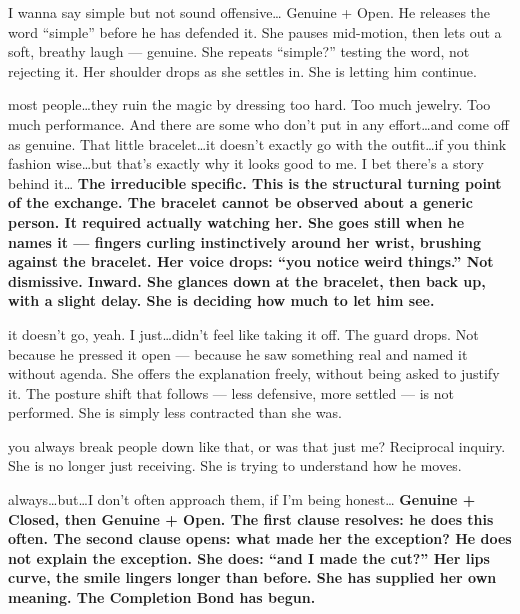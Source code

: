 {I wanna say simple but not sound offensive\ldots}
{Genuine + Open. He releases the word ``simple'' before he has defended it. She pauses mid-motion, then lets out a soft, breathy laugh --- genuine. She repeats ``simple?'' testing the word, not rejecting it. Her shoulder drops as she settles in. She is letting him continue.}

\thinrule

{most people\ldots they ruin the magic by dressing too hard. Too much jewelry. Too much performance. And there are some who don't put in any effort\ldots and come off as genuine. That little bracelet\ldots it doesn't exactly go with the outfit\ldots if you think fashion wise\ldots but that's exactly why it looks good to me. I bet there's a story behind it\ldots}
{\textbf{The irreducible specific. This is the structural turning point of the exchange. The bracelet cannot be observed about a generic person. It required actually watching her. She goes still when he names it --- fingers curling instinctively around her wrist, brushing against the bracelet. Her voice drops: ``you notice weird things.'' Not dismissive. Inward. She glances down at the bracelet, then back up, with a slight delay. She is deciding how much to let him see.}}

{it doesn't go, yeah. I just\ldots didn't feel like taking it off.}
{The guard drops. Not because he pressed it open --- because he saw something real and named it without agenda. She offers the explanation freely, without being asked to justify it. The posture shift that follows --- less defensive, more settled --- is not performed. She is simply less contracted than she was.}

\thinrule

{you always break people down like that, or was that just me?}
{Reciprocal inquiry. She is no longer just receiving. She is trying to understand how he moves.}

{always\ldots but\ldots I don't often approach them, if I'm being honest\ldots}
{\textbf{Genuine + Closed, then Genuine + Open. The first clause resolves: he does this often. The second clause opens: what made her the exception? He does not explain the exception. She does: ``and I made the cut?'' Her lips curve, the smile lingers longer than before. She has supplied her own meaning. The Completion Bond has begun.}}

